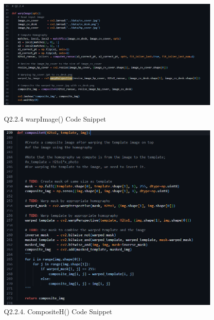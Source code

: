 \documentclass{article}
\begin{document}
	\begin{figure}[H]
	\centering
	\begin{minipage}[b]{0.45\textwidth}
		\centering
		\includegraphics[width=\textwidth]{Q2_2_4_warpImage_cns.png}  %
		\caption{Q2.2.4 warpImage() Code Snippet}
		\label{fig:Q224_warpImage_cns}
	\end{minipage}
	\hfill  %
	\begin{minipage}[b]{0.45\textwidth}
		\centering
		\includegraphics[width=\textwidth]{Q2_2_4_compositH_cns.png}  %
		\caption{Q2.2.4. CompositeH() Code Snippet}
		\label{fig:Q224_compositeH_cns}
	\end{minipage}	
	\end{figure}	
	
	\newpage
\end{document}
